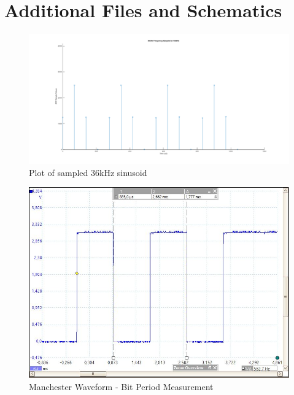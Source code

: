 \chapter{Additional Files and Schematics}
\label{ch_appendixa}






\begin{figure}[H]
	\centering
	\includegraphics[width=\linewidth]{figures/results/36khz_frequency.png}
	\caption{Plot of sampled 36kHz sinusoid}
	\label{fig:sampled_36khz_sinusoid}
\end{figure}

\begin{figure}[H]
	\centering
	\includegraphics[width=.8\linewidth]{figures/results/manchester/delta_bit_period.JPG}
	\caption{Manchester Waveform - Bit Period Measurement}
	\label{fig:delta_bit_period}
\end{figure}



